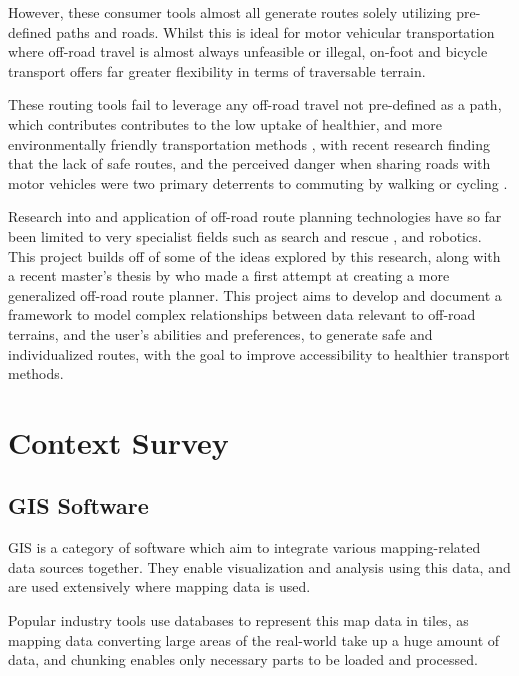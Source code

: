 \documentclass[12pt]{article}
\begin{document}
However, these consumer tools almost all generate routes solely utilizing pre-defined paths and roads. Whilst this is ideal for motor vehicular transportation where off-road travel is almost always unfeasible or illegal, on-foot and bicycle transport offers far greater flexibility in terms of traversable terrain.

These routing tools fail to leverage any off-road travel not pre-defined as a path, which contributes contributes to the low uptake of healthier, and more environmentally friendly transportation methods \autocite{ukgov2021travel}, with recent research finding that the lack of safe routes, and the perceived danger when sharing roads with motor vehicles were two primary deterrents to commuting by walking or cycling \autocite{ek2021motives,singleton2019walking}.

Research into and application of off-road route planning technologies have so far been limited to very specialist fields such as search and rescue \autocite{zhao2024searchrescue}, and robotics. This project builds off of some of the ideas explored by this research, along with a recent master's thesis by \textcite{evans2023tsr} who made a first attempt at creating a more generalized off-road route planner. This project aims to develop and document a framework to model complex relationships between data relevant to off-road terrains, and the user's abilities and preferences, to generate safe and individualized routes, with the goal to improve accessibility to healthier transport methods.

\section{Context Survey}

\subsection{GIS Software}

GIS is a category of software which aim to integrate various mapping-related data sources together. They enable visualization and analysis using this data, and are used extensively where mapping data is used.

Popular industry tools use databases to represent this map data in tiles, as mapping data converting large areas of the real-world take up a huge amount of data, and chunking enables only necessary parts to be loaded and processed.
\end{document}
